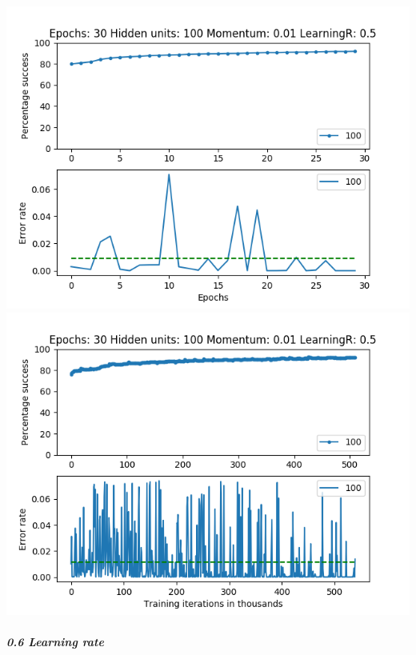 \documentclass[11pt]{article}
\makeatletter
\def\maxwidth{\ifdim\Gin@nat@width>\linewidth\linewidth
    \else\Gin@nat@width\fi}
\let\Oldincludegraphics\includegraphics
\renewcommand{\includegraphics}[1]{\Oldincludegraphics[width=.8\maxwidth]{#1}}
\makeatother
\begin{document}
\includegraphics{Experiment2/E2_NN_Epoch_Momentum_0.01_30Epochs_100_LR_0.5_Hiddenunits.png}
\includegraphics{Experiment2/E2_NN_Training_Momentum_0.01_30Epochs_100_LR_0.5_Hiddenunits.png}

\hypertarget{learning-rate-6}{%
\subparagraph{0.6 Learning rate}\label{learning-rate-6}}
\end{document}
